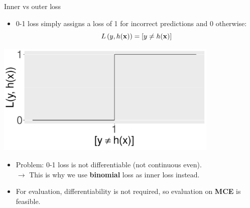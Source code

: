 \documentclass[11pt,compress,t,notes=noshow, xcolor=table]{beamer}
\begin{document}
\begin{vbframe}{Inner vs outer loss}
\begin{minipage}{0.6\textwidth}
  \begin{itemize}
    \item 0-1 loss simply assigns a loss of 1 for incorrect predictions and 0
    otherwise: $$L\left(y, h(\mathbf{x})\right) = [y \neq h(\mathbf{x})]$$
  \end{itemize}
\end{minipage}%
\begin{minipage}{0.4\textwidth}
  \centering
  \includegraphics[width=0.8\textwidth]{figure/zero-one-loss}
\end{minipage}

\lz

\begin{itemize}
  \item Problem: 0-1 loss is not differentiable (not continuous even). \\
  $\rightarrow$ This is why we use \textbf{binomial} loss as inner loss 
  instead.
  \item For evaluation, differentiability is not required, so evaluation on 
  \textbf{MCE} is feasible. 
\end{itemize}

\normalsize

\end{vbframe}


\endlecture
\end{document}
